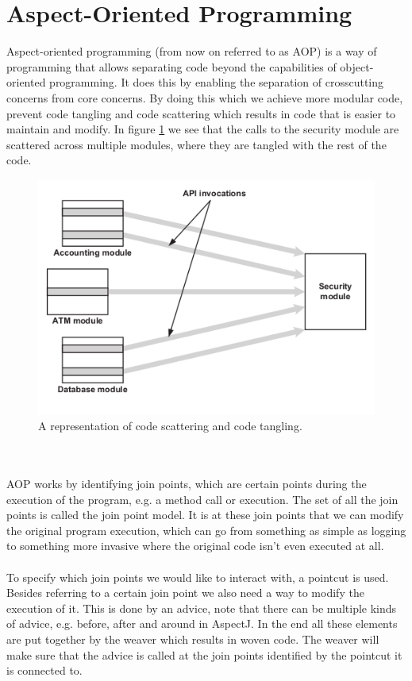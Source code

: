 \documentclass[a4paper]{report}
\begin{document}
\section{Aspect-Oriented Programming}
Aspect-oriented programming \cite{kiczales_aspect-oriented_1997} (from now on referred to as AOP) is a way of programming that allows separating code beyond the capabilities of object-oriented programming. It does this by enabling the separation of crosscutting concerns from core concerns. By doing this which we achieve more modular code, prevent code tangling and code scattering which results in code that is easier to maintain and modify. In figure \ref{fig:Code_Scattering} we see that the calls to the security module are scattered across multiple modules, where they are tangled with the rest of the code.\\
\begin{figure}[h!]
\centering
\includegraphics[scale=0.5]{images/Code_Scattering.png}
\caption{A representation of code scattering and code tangling.}
\label{fig:Code_Scattering}
\end{figure}\\
\\
AOP works by identifying join points, which are certain points during the execution of the program, e.g. a method call or execution. The set of all the join points is called the join point model. It is at these join points that we can modify the original program execution, which can go from something as simple as logging to something more invasive where the original code isn't even executed at all.\\
\\
To specify which join points we would like to interact with, a pointcut is used. Besides referring to a certain join point we also need a way to modify the execution of it. This is done by an advice, note that there can be multiple kinds of advice, e.g. before, after and around in AspectJ. In the end all these elements are put together by the weaver which results in woven code. The weaver will make sure that the advice is called at the join points identified by the pointcut it is connected to.\\
\end{document}
